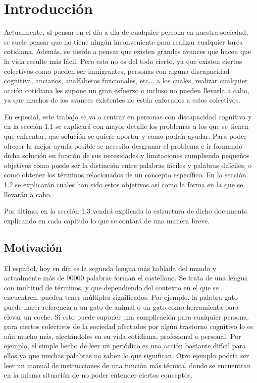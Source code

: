 \chapter{Introducción}
\label{cap:introduccion}

Actualmente, al pensar en el día a día de cualquier persona en nuestra sociedad, se suele pensar que no tiene ningún inconveniente para realizar cualquier tarea cotidiana. Además, se tiende a pensar que existen grandes avances que hacen que la vida resulte más fácil.
Pero esto no es del todo cierto, ya que existen ciertos colectivos como pueden ser inmigrantes, personas con alguna discapacidad cognitiva, ancianos, analfabetos funcionales, etc... a los cuales, realizar cualquier acción cotidiana les supone un gran esfuerzo o incluso no pueden llevarla a cabo, ya que muchos de los avances existentes no están enfocados a estos colectivos.

En especial, este trabajo se va a centrar en personas con discapacidad cognitiva y en la sección 1.1 se explicará con mayor detalle los problemas a los que se tienen que enfrentar, que solución se quiere aportar y como podría ayudar.
Para poder ofrecer la mejor ayuda posible se necesita desgranar el problema e ir formando dicha solución en función de sus necesidades y limitaciones cumpliendo pequeños objetivos como puede ser la distinción entre palabras fáciles y palabras difíciles, o como obtener los términos relacionados de un concepto específico. En la sección 1.2 se explicarán cuales han sido estos objetivos así como la forma en la que se llevarán a cabo.

Por último, en la sección 1.3 vendrá explicada la estructura de dicho documento explicando en cada capítulo lo que se contará de una manera breve.


\section{Motivación}
\label{cap:sec:motivacion}

El español, hoy en día es la segunda lengua más hablada del mundo y actualmente más de 90000 palabras forman el castellano. 
Se trata de una lengua con multitud de términos, y que dependiendo del contexto en el que se encuentren, pueden tener múltiples significados. Por ejemplo, la palabra gato puede hacer referencia a un gato de animal o un gato como herramienta para elevar un coche.
Si esto puede suponer una complicación para cualquier persona, para ciertos colectivos de la sociedad afectados por algún trastorno cognitivo lo es aún mucho más, afectándoles en su vida cotidiana, profesional o personal. Por ejemplo, el simple hecho de leer un periódico es una acción bastante difícil para ellos ya que muchas palabras no saben lo que significan. Otro ejemplo podría ser leer un manual de instrucciones de una función más técnica, donde se encuentran en la misma situación de no poder entender ciertos conceptos.

